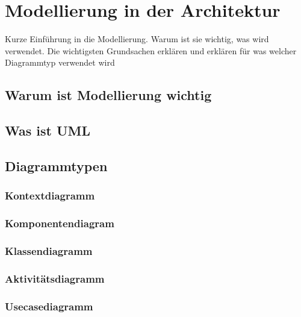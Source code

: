 \chapter{Modellierung in der Architektur}
Kurze Einführung in die Modellierung. Warum ist sie wichtig, was wird verwendet. Die wichtigsten Grundsachen erklären und erklären für was welcher Diagrammtyp verwendet wird

\cite[S. 13]{reqanalysis}
\cite[S. 139]{effektiv}

\section{Warum ist Modellierung wichtig}
\section{Was ist UML}

\section{Diagrammtypen}
\subsection{Kontextdiagramm}
\subsection{Komponentendiagram}
\subsection{Klassendiagramm}
\subsection{Aktivitätsdiagramm}
\subsection{Usecasediagramm}